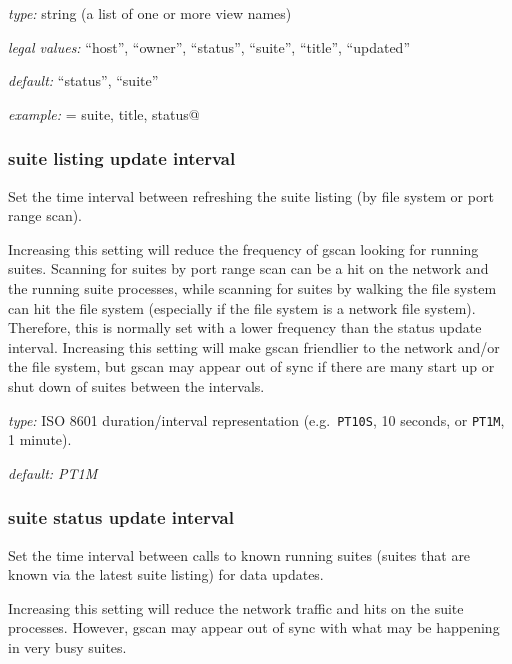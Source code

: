 \begin{myitemize}
\item {\em type:} string (a list of one or more view names)
\item {\em legal values:} ``host'', ``owner'', ``status'', ``suite'',
  ``title'', ``updated''
\item {\em default:} ``status'', ``suite''
\item {\em example:} \lstinline@columns = suite, title, status@
\end{myitemize}

\subsubsection{suite listing update interval}

Set the time interval between refreshing the suite listing (by file system or
port range scan).

Increasing this setting will reduce the frequency of gscan looking for running
suites. Scanning for suites by port range scan can be a hit on the network and
the running suite processes, while scanning for suites by walking the file
system can hit the file system (especially if the file system is a network file
system). Therefore, this is normally set with a lower frequency than the status
update interval. Increasing this setting will make gscan friendlier to the
network and/or the file system, but gscan may appear out of sync if there are
many start up or shut down of suites between the intervals.

\begin{myitemize}
\item {\em type:} ISO 8601 duration/interval representation (e.g.\ 
\lstinline=PT10S=, 10 seconds, or \lstinline=PT1M=, 1 minute).
\item {\em default: PT1M}
\end{myitemize}

\subsubsection{suite status update interval}

Set the time interval between calls to known running suites (suites that are
known via the latest suite listing) for data updates.

Increasing this setting will reduce the network traffic and hits on the suite
processes. However, gscan may appear out of sync with what may be happening
in very busy suites.

